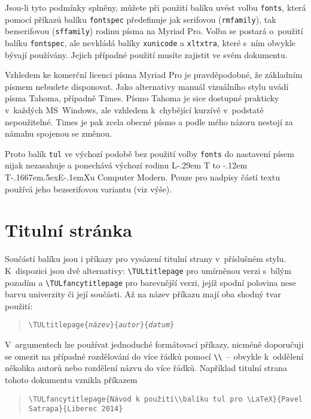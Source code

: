 \documentclass[a4paper,12pt,twoside]{article}
\makeatletter
\newcommand{\cmdfont}[1]{\texttt{\color{\tulcolor}#1}}
\newcommand{\cmd}[1]{\cmdfont{\textbackslash #1}}
\def\TeX{T\kern-.1667em\lower.5ex\hbox{E}\kern-.1emX\@}
\DeclareRobustCommand{\LaTeX}{L\kern-.29em%
        {\sbox\z@ T%
         \vbox to\ht\z@{\hbox{\check@mathfonts
                              \fontsize\sf@size\z@
                              \math@fontsfalse\selectfont
                              A}%
                        \vss}%
        }%
        \kern-.12em%
        \TeX}
\makeatother
\begin{document}
Jsou-li tyto podmínky splněny, můžete při použití balíku uvést volbu
\cmdfont{fonts}, která pomocí příkazů balíku \cmdfont{fontspec} předefinuje jak
serifovou (\cmdfont{rmfamily}), tak bezserifovou (\cmdfont{sffamily}) rodinu
písma na Myriad Pro. Volba se postará o~použití balíku \cmdfont{fontspec}, ale
nevkládá balíky \cmdfont{xunicode} a \cmdfont{xltxtra}, které s~ním obvykle
bývají používány. Jejich případné použití musíte zajistit ve svém dokumentu.

Vzhledem ke komerční licenci písma Myriad Pro je pravděpodobné, že základním
písmem nebudete disponovat. Jako alternativy manuál vizuálního stylu uvádí
písma Tahoma, případně Times. Písmo Tahoma je sice dostupné prakticky v~každých
MS~Windows, ale vzhledem k~chybějící kurzívě v~podstatě nepoužitelné. Times je
pak zcela obecné písmo a podle mého názoru nestojí za námahu spojenou se
změnou.

Proto balík \cmdfont{tul} ve výchozí podobě bez použití volby \cmdfont{fonts}
do nastavení písem nijak nezasahuje a ponechává výchozí rodinu \LaTeX u
Computer Modern. Pouze pro nadpisy částí textu používá jeho bezserifovou
variantu (viz výše).


\section{Titulní stránka}

Součástí balíku jsou i příkazy pro vysázení titulní strany v~příslušném stylu.
K~dispozici jsou dvě alternativy: \cmd{TULtitlepage} pro umírněnou verzi
s~bílým pozadím a \cmd{TULfancytitlepage} pro barevnější verzi, jejíž spodní
polovina nese barvu univerzity či její součásti. Až na název příkazu mají oba
shodný tvar použití:

\begin{quote}
\cmd{TULtitlepage\{\emph{název}\}\{\emph{autor}\}\{\emph{datum}\}}
\end{quote}

V~argumentech lze používat jednoduché formátovací příkazy, nicméně
doporučuji se omezit na případné rozdělování do více řádků pomocí
\cmd{\textbackslash}~-- obvykle k~oddělení několika autorů nebo rozdělení
názvu do více řádků. Například titulní strana tohoto dokumentu vznikla
příkazem

\begin{quote}\begin{flushleft}
\cmd{TULfancytitlepage\{Návod k~použití\textbackslash\textbackslash balíku tul
pro \textbackslash LaTeX\}\{Pavel Satrapa\}\{Liberec 2014\}}
\end{flushleft}\end{quote}
\end{document}
